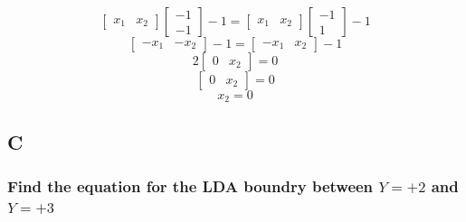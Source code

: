 \documentclass[12pt]{article}
\begin{document}
\[
    \begin{bmatrix} x_1 & x_2\end{bmatrix}\begin{bmatrix} -1 \\ -1\end{bmatrix}-1
    =
    \begin{bmatrix} x_1 & x_2\end{bmatrix}\begin{bmatrix} -1 \\ 1\end{bmatrix}-1
\]
\[
    \begin{bmatrix} -x_1 & -x_2\end{bmatrix}-1
    =
    \begin{bmatrix} -x_1 & x_2\end{bmatrix}-1
\]
\[
    2\begin{bmatrix} 0 & x_2\end{bmatrix} = 0
\]
\[
    \begin{bmatrix} 0 & x_2\end{bmatrix} = 0
\]
\[
    x_2 = 0
\]

\subsection{C}
\subsubsection{Find the equation for the LDA boundry between $Y = +2$ and $Y = +3$}
\end{document}
